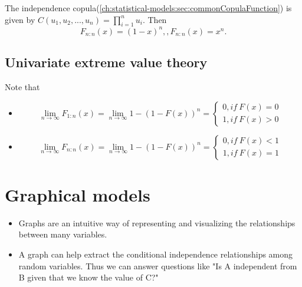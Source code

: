 \begin{refsection}
\begin{remark}
The independence copula(\autoref{ch:statistical-models:sec:commonCopulaFunction}) is given by $C(u_1,u_2,...,u_n) = \prod_{i=1}^n u_i$. Then
$$F_{n:n}(x) = (1-x)^n,,F_{n:n}(x) = x^n. $$
 	
\end{remark}



\subsection{Univariate extreme value theory}



\begin{note}\cite[442]{roncalli2016lecture}
Note that
\begin{itemize}
	\item $$\lim_{n\to \infty} F_{1:n}(x) = \lim_{n\to \infty} 1 - (1 - F(x))^n= \begin{cases*}
	0, if ~ F(x) = 0\\
	1, if ~ F(x) > 0
	\end{cases*}$$
	\item $$\lim_{n\to \infty} F_{n:n}(x) = \lim_{n\to \infty} 1 - (1 - F(x))^n= \begin{cases*}
	0, if ~ F(x) < 1\\
	1, if ~ F(x) = 1
	\end{cases*}$$	
	
\end{itemize}
	



\end{note}


\section{Graphical models}\label{ch:theory-of-statistics:sec:graphical-models}

\begin{remark}[motivation]\hfill
\begin{itemize}
	\item Graphs are an intuitive way of representing and visualizing the relationships between many variables. 
	\item A graph can help extract the conditional independence relationships among random variables. Thus we can answer questions like "Is A independent from B given that we know the value of C?"
\end{itemize}	
\end{remark}



\end{refsection}
